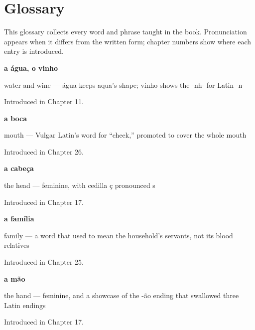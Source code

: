 
\chapter*{Glossary}

This glossary collects every word and phrase taught in the book. Pronunciation appears when it differs from the written form; chapter numbers show where each entry is introduced.

\noindent\begin{minipage}[t]{\linewidth}
\raggedright
\textbf{a água, o vinho}\par
\small water and wine — água keeps aqua's shape; vinho shows the -nh- for Latin -n-\par
\footnotesize Introduced in Chapter 11.
\end{minipage}\par\medskip

\noindent\begin{minipage}[t]{\linewidth}
\raggedright
\textbf{a boca}\par
\small mouth — Vulgar Latin's word for \textquotedblleft{}cheek,\textquotedblright{} promoted to cover the whole mouth\par
\footnotesize Introduced in Chapter 26.
\end{minipage}\par\medskip

\noindent\begin{minipage}[t]{\linewidth}
\raggedright
\textbf{a cabeça}\par
\small the head — feminine, with cedilla ç pronounced s\par
\footnotesize Introduced in Chapter 17.
\end{minipage}\par\medskip

\noindent\begin{minipage}[t]{\linewidth}
\raggedright
\textbf{a família}\par
\small family — a word that used to mean the household's servants, not its blood relatives\par
\footnotesize Introduced in Chapter 25.
\end{minipage}\par\medskip

\noindent\begin{minipage}[t]{\linewidth}
\raggedright
\textbf{a mão}\par
\small the hand — feminine, and a showcase of the -ão ending that swallowed three Latin endings\par
\footnotesize Introduced in Chapter 17.
\end{minipage}\par\medskip

